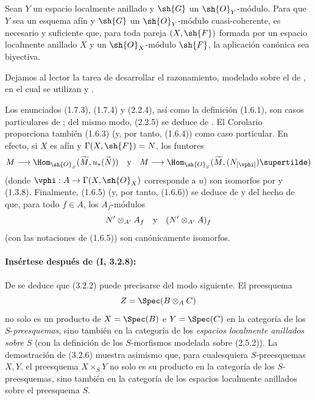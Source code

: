 \documentclass[oneside,10pt]{amsart}
\makeatletter
\newcommand{\ega@arrow}[2]{\mathchoice{#1}{#2}{#2}{#2}}
\renewcommand{\to}{\ega@arrow{\longrightarrow}{\rightarrow}}
\let\EGAOriginalLabel\label
\renewcommand{\label}[1]{\phantomsection\EGAOriginalLabel{#1}}
\makeatother
\begin{document}
\begin{corollary}[1.8.10]
\label{ega2:addendum:I.1.8.10}
Sean $Y$ un espacio localmente anillado y $\sh{G}$ un
$\sh{O}_Y$-módulo. Para que $Y$ sea un esquema afín y $\sh{G}$ un
$\sh{O}_Y$-módulo cuasi-coherente, es necesario y suficiente que, para
toda pareja $(X,\sh{F})$ formada por un espacio localmente anillado $X$
y un $\sh{O}_X$-módulo $\sh{F}$, la aplicación canónica
 sea biyectiva.
\end{corollary}

Dejamos al lector la tarea de desarrollar el razonamiento, modelado
sobre el de , en el cual se utilizan  y
.

\begin{remark}[1.8.11]
\label{ega2:addendum:I.1.8.11}
Los enunciados (1.7.3), (1.7.4) y (2.2.4), así como la
definición (1.6.1), son casos particulares de ; del
mismo modo, (2.2.5) se deduce de . El
Corolario~ proporciona también (1.6.3) (y, por tanto,
(1.6.4)) como caso particular. En efecto, si $X$ es afín y
$\Gamma(X,\sh{F})=N$, los funtores
\[
  M\to
  \Hom_{\sh{O}_S}(\widetilde M,u_*(\widetilde N))
  \quad\hbox{y}\quad
  M\to
  \Hom_{\sh{O}_S}(\widetilde M,(N_{[\vphi]})\supertilde)
\]
(donde $\vphi:A\to\Gamma(X,\sh{O}_X)$ corresponde a $u$) son
isomorfos por  y (1.3.8). Finalmente, (1.6.5) (y,
por tanto, (1.6.6)) se deduce de  y del hecho de que,
para todo $f\in A$, los $A_f$-módulos
\[
  N'\otimes_{A'}A_f
  \quad\hbox{y}\quad
  (N'\otimes_{A'}A)_f
\]
(con las notaciones de (1.6.5)) son canónicamente isomorfos.
\end{remark}

\paragraph{Insértese después de (I, 3.2.8):}

\begin{env}[3.2.9]
\label{ega2:addendum:I.3.2.9}
De  se deduce que (3.2.2) puede precisarse del modo
siguiente. El preesquema
\[
  Z=\Spec(B\otimes_A C)
\]
no solo es un producto de $X=\Spec(B)$ e $Y=\Spec(C)$ en la categoría
de los $S$-\emph{preesquemas}, sino también en la categoría de los \emph{espacios
localmente anillados} \emph{sobre} $S$ (con la definición de los
$S$-morfismos modelada sobre (2.5.2)). La demostración de (3.2.6)
muestra asimismo que, para cualesquiera $S$-preesquemas $X,Y$, el
preesquema $X\times_S Y$ no solo es su producto en la categoría de los
$S$-preesquemas, sino también en la categoría de los espacios
localmente anillados sobre el preesquema $S$.
\end{env}
\end{document}
